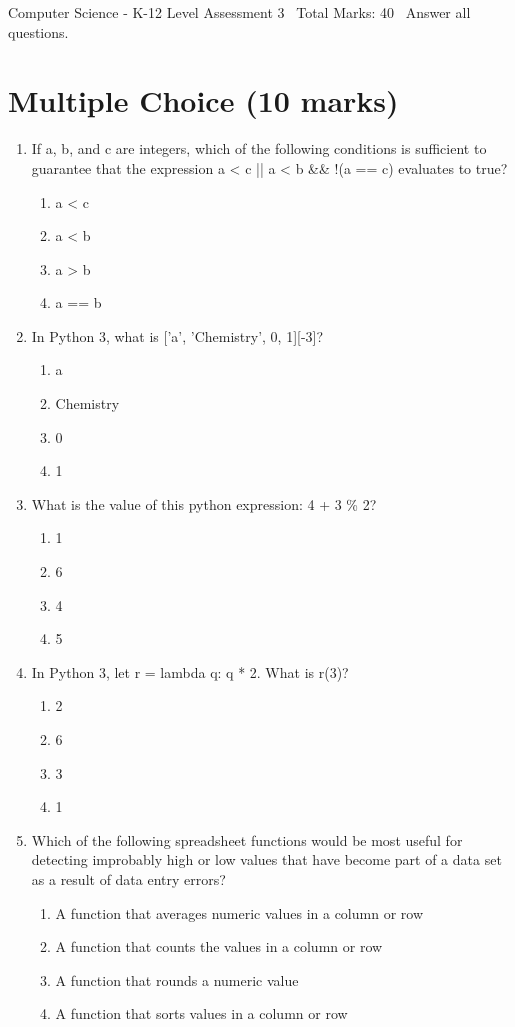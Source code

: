\documentclass[12pt]{article}
\begin{document}
\begin{center}
Computer Science - K-12 Level Assessment 3 \
Total Marks: 40 \
Answer all questions.
\end{center}

\section*{Multiple Choice (10 marks)}
\begin{enumerate}[label=\arabic*.]
\item If a, b, and c are integers, which of the following conditions is sufficient to guarantee
that the expression a \textless{} c || a \textless{} b \&\& !(a == c) evaluates to true?
\begin{enumerate}[label=(\alph*)]
    \item a \textless{} c
    \item a \textless{} b
    \item a \textgreater{} b
    \item a == b
\end{enumerate}
\item In Python 3, what is ['a', 'Chemistry', 0, 1][-3]?
\begin{enumerate}[label=(\alph*)]
    \item a
    \item Chemistry
    \item 0
    \item 1
\end{enumerate}
\item What is the value of this python expression: 4 + 3 \% 2?
\begin{enumerate}[label=(\alph*)]
    \item 1
    \item 6
    \item 4
    \item 5
\end{enumerate}
\item In Python 3, let r = lambda q: q * 2. What is r(3)?
\begin{enumerate}[label=(\alph*)]
    \item 2
    \item 6
    \item 3
    \item 1
\end{enumerate}
\item Which of the following spreadsheet functions would be most useful for detecting improbably
high or low values that have become part of a data set as a result of data entry errors?
\begin{enumerate}[label=(\alph*)]
    \item A function that averages numeric values in a column or row
    \item A function that counts the values in a column or row
    \item A function that rounds a numeric value
    \item A function that sorts values in a column or row
\end{enumerate}
\end{enumerate}
\end{document}
